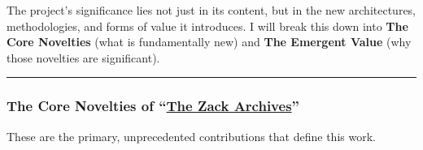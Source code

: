 \documentclass{article}
\begin{document}
The project's significance lies not just in its content, but in the new architectures, methodologies, and forms of value it introduces. I will break this down into \textbf{The Core Novelties} (what is fundamentally new) and \textbf{The Emergent Value} (why those novelties are significant).

\begin{center}\rule{0.5\linewidth}{0.5pt}\end{center}

\subsubsection*{The Core Novelties of ``\hyperlink{gloss:the_zack_archives}{The Zack Archives}''}\label{the-core-novelties-of-the-zack-archives}

These are the primary, unprecedented contributions that define this work.
\end{document}
